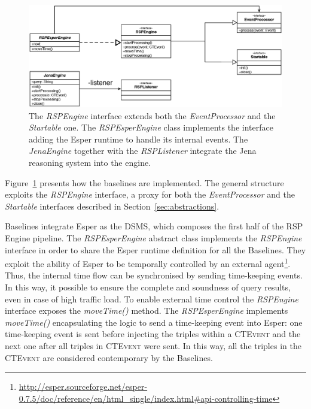 \begin{figure}[tbh]
  \centering
	\includegraphics[width=\linewidth]{images/uml_baselines_general}
	\caption[\textit{RSPEngine} Implementation Through Esper and Jena - UML Schema]{The \textit{RSPEngine} interface extends both the \textit{EventProcessor} and the \textit{Startable} one. The \textit{RSPEsperEngine} class implements the interface adding the Esper runtime to handle its internal events. The \textit{JenaEngine} together with the \textit{RSPListener} integrate the Jena reasoning system into the engine.}
  	\label{fig:uml_baselines_general}
\end{figure}

\noindent Figure~\ref{fig:uml_baselines_general} presents how the baselines are implemented. The general structure exploits the \textit{RSPEngine} interface, a proxy for both the \textit{EventProcessor} and the \textit{Startable} interfaces described in Section~\ref{sec:abstractions}. 

\name Baselines integrate Esper as the DSMS, which composes the first half of the RSP Engine pipeline. The \textit{RSPEsperEngine} abstract class implements the \textit{RSPEngine} interface in order to share the Esper runtime definition for all the Baselines.  They exploit the ability of Esper to be temporally controlled by an external agent\footnote{\url{http://esper.sourceforge.net/esper-0.7.5/doc/reference/en/html_single/index.html#api-controlling-time}}. Thus, the internal time flow can be synchronised by sending time-keeping events. In this way, it possible to ensure the complete and soundness of query results, even in case of high traffic load. To enable external time control the \textit{RSPEngine} interface exposes the \textit{moveTime()} method.  The \textit{RSPEsperEngine} implements \textit{moveTime()} encapsulating the logic to send a time-keeping event into Esper: one time-keeping event is sent before injecting the triples within a \textsc{CTEvent} and the next one after all triples in \textsc{CTEvent} were sent. In this way, all the triples in the \textsc{CTEvent} are considered contemporary by the Baselines. 

